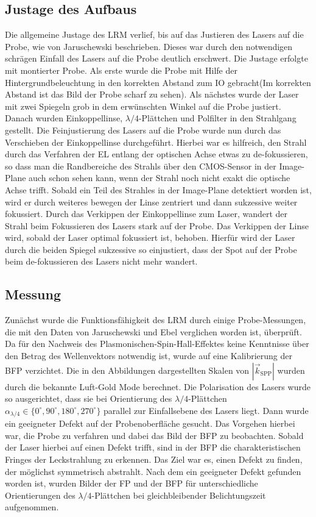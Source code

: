 \documentclass[titlepage]{article}
\begin{document}
	\subsection{Justage des Aufbaus}
	Die allgemeine Justage des LRM verlief, bis auf das Justieren des Lasers auf die Probe, wie von Jaruschewski \cite{Jaruschewski.2020} beschrieben. Dieses war durch den notwendigen schrägen Einfall des Lasers auf die Probe deutlich erschwert. Die Justage erfolgte mit montierter Probe. Als erste wurde die Probe mit Hilfe der Hintergrundbeleuchtung in den korrekten Abstand zum IO gebracht(Im korrekten Abstand ist das Bild der Probe scharf zu sehen). Als nächstes wurde der Laser mit zwei Spiegeln grob in dem erwünschten Winkel auf die Probe justiert. Danach wurden Einkoppellinse, $\lambda/4$-Plättchen und Polfilter in den Strahlgang gestellt. Die Feinjustierung des Lasers auf die Probe wurde nun durch das Verschieben der Einkoppellinse durchgeführt. Hierbei war es hilfreich, den Strahl durch das Verfahren der EL entlang der optischen Achse etwas zu de-fokussieren, so dass man die Randbereiche des Strahls über den CMOS-Sensor in der Image-Plane auch schon sehen kann, wenn der Strahl noch nicht exakt die optische Achse trifft. Sobald ein Teil des Strahles in der Image-Plane detektiert worden ist, wird er durch weiteres bewegen der Linse zentriert und dann sukzessive weiter fokussiert. Durch das Verkippen der Einkoppellinse zum Laser, wandert der Strahl beim Fokussieren des Lasers stark auf der Probe. Das Verkippen der Linse wird, sobald der Laser optimal fokussiert ist, behoben. Hierfür wird der Laser durch die beiden Spiegel sukzessive so einjustiert, dass der Spot auf der Probe beim de-fokussieren des Lasers nicht mehr wandert. 
	\subsection{Messung}
	Zunächst wurde die Funktionsfähigkeit des LRM durch einige Probe-Messungen, die mit den Daten von Jaruschewski \cite{Jaruschewski.2020} und Ebel \cite{ebel.2019} verglichen worden ist, überprüft. Da für den Nachweis des Plasmonischen-Spin-Hall-Effektes keine Kenntnisse über den Betrag des Wellenvektors notwendig ist, wurde auf eine Kalibrierung der BFP verzichtet. Die in den Abbildungen dargestellten Skalen von $|\vec{k}_{\mathrm{SPP}}|$ wurden durch die bekannte Luft-Gold Mode berechnet. Die Polarisation des Lasers wurde so ausgerichtet, dass sie bei Orientierung des $\lambda/4$-Plättchen $\alpha_{\lambda/4} \in \{0^\circ, 90^\circ, 180^\circ, 270^\circ\}$ parallel zur Einfallsebene des Lasers liegt.  Dann wurde ein geeigneter Defekt auf der Probenoberfläche gesucht. Das Vorgehen hierbei war, die Probe zu verfahren und dabei das Bild der BFP zu beobachten. Sobald der Laser hierbei auf einen Defekt trifft, sind in der BFP die charakteristischen Fringes der Leckstrahlung zu erkennen. Das Ziel war es, einen Defekt zu finden, der möglichst symmetrisch abstrahlt. Nach dem ein geeigneter Defekt gefunden worden ist, wurden Bilder der FP und der BFP für unterschiedliche Orientierungen des $\lambda/4$-Plättchen bei gleichbleibender Belichtungszeit aufgenommen.
	
\end{document}
